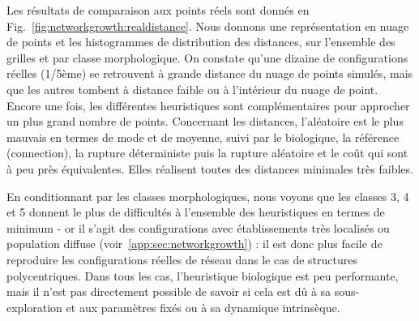 \begin{figure}
\end{figure}







Les résultats de comparaison aux points réels sont donnés en Fig.~\ref{fig:networkgrowth:realdistance}. Nous donnons une représentation en nuage de points et les histogrammes de distribution des distances, sur l'ensemble des grilles et par classe morphologique. On constate qu'une dizaine de configurations réelles (1/5ème) se retrouvent à grande distance du nuage de points simulés, mais que les autres tombent à distance faible ou à l'intérieur du nuage de point. Encore une fois, les différentes heuristiques sont complémentaires pour approcher un plus grand nombre de points. Concernant les distances, l'aléatoire est le plus mauvais en termes de mode et de moyenne, suivi par le biologique, la référence (connection), la rupture déterministe puis la rupture aléatoire et le coût qui sont à peu près équivalentes. Elles réalisent toutes des distances minimales très faibles.


En conditionnant par les classes morphologiques, nous voyons que les classes 3, 4 et 5 donnent le plus de difficultés à l'ensemble des heuristiques en termes de minimum - or il s'agit des configurations avec établissements très localisés ou population diffuse (voir~\ref{app:sec:networkgrowth}) : il est donc plus facile de reproduire les configurations réelles de réseau dans le cas de structures polycentriques. Dans tous les cas, l'heuristique biologique est peu performante, mais il n'est pas directement possible de savoir si cela est dû à sa sous-exploration et aux paramètres fixés ou à sa dynamique intrinsèque.






